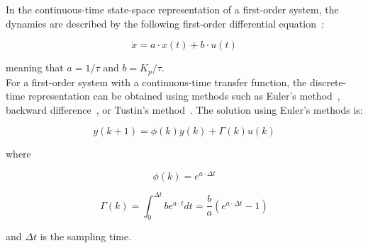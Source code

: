 In the continuous-time state-space representation of a first-order system, the dynamics are described by the following first-order differential equation~\cite{ayomoh2012}:

\begin{equation}
    \dot{x} = a \cdot x(t) + b \cdot u(t)
\end{equation}

meaning that $a = 1/\tau$ and $b = K_{p}/\tau$. \\

For a first-order system with a continuous-time transfer function, the discrete-time representation can be obtained using methods such as Euler's method~\cite{griffiths2010}, backward difference~\cite{suleiman2011}, or Tustin's method~\cite{phillips1985}. The solution using Euler's methods is:

\begin{equation}
    y(k + 1) = \phi(k) y(k) + \Gamma(k) u(k)
\end{equation}

where

\begin{equation}
    \phi(k) = e^{a \cdot \Delta t}
\end{equation}

\begin{equation}
    \Gamma(k) = \int_{0}^{\Delta t}{b} e^{a \cdot t} dt = \frac{b}{a} \left( e^{a \cdot \Delta t} - 1\right)
\end{equation}

and $\Delta t$ is the sampling time.


